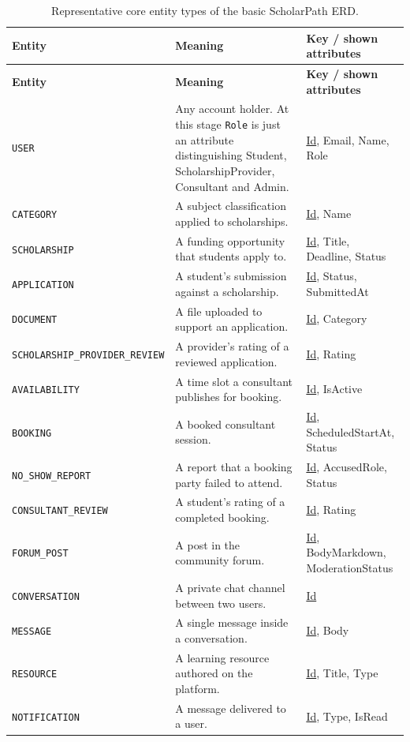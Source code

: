 \documentclass[11pt,a4paper]{article}
\begin{document}
\begin{longtable}{@{}>{\raggedright\arraybackslash}p{2.9cm}>{\raggedright\arraybackslash}p{8.5cm}>{\raggedright\arraybackslash}p{2.6cm}@{}}
\caption{Representative core entity types of the basic ScholarPath ERD.}
\label{tab:entities}\\
\toprule
\textbf{Entity} & \textbf{Meaning} & \textbf{Key / shown attributes} \\
\midrule
\endfirsthead
\toprule
\textbf{Entity} & \textbf{Meaning} & \textbf{Key / shown attributes} \\
\midrule
\endhead
\bottomrule
\endfoot
\texttt{USER} & Any account holder. At this stage \texttt{Role} is just an attribute distinguishing Student, ScholarshipProvider, Consultant and Admin. & \underline{Id}, Email, Name, Role \\
\texttt{CATEGORY} & A subject classification applied to scholarships. & \underline{Id}, Name \\
\texttt{SCHOLARSHIP} & A funding opportunity that students apply to. & \underline{Id}, Title, Deadline, Status \\
\texttt{APPLICATION} & A student's submission against a scholarship. & \underline{Id}, Status, SubmittedAt \\
\texttt{DOCUMENT} & A file uploaded to support an application. & \underline{Id}, Category \\
\texttt{SCHOLARSHIP\_PROVIDER\_REVIEW} & A provider's rating of a reviewed application. & \underline{Id}, Rating \\
\texttt{AVAILABILITY} & A time slot a consultant publishes for booking. & \underline{Id}, IsActive \\
\texttt{BOOKING} & A booked consultant session. & \underline{Id}, ScheduledStartAt, Status \\
\texttt{NO\_SHOW\_REPORT} & A report that a booking party failed to attend. & \underline{Id}, AccusedRole, Status \\
\texttt{CONSULTANT\_REVIEW} & A student's rating of a completed booking. & \underline{Id}, Rating \\
\texttt{FORUM\_POST} & A post in the community forum. & \underline{Id}, BodyMarkdown, ModerationStatus \\
\texttt{CONVERSATION} & A private chat channel between two users. & \underline{Id} \\
\texttt{MESSAGE} & A single message inside a conversation. & \underline{Id}, Body \\
\texttt{RESOURCE} & A learning resource authored on the platform. & \underline{Id}, Title, Type \\
\texttt{NOTIFICATION} & A message delivered to a user. & \underline{Id}, Type, IsRead \\
\end{longtable}
\end{document}
